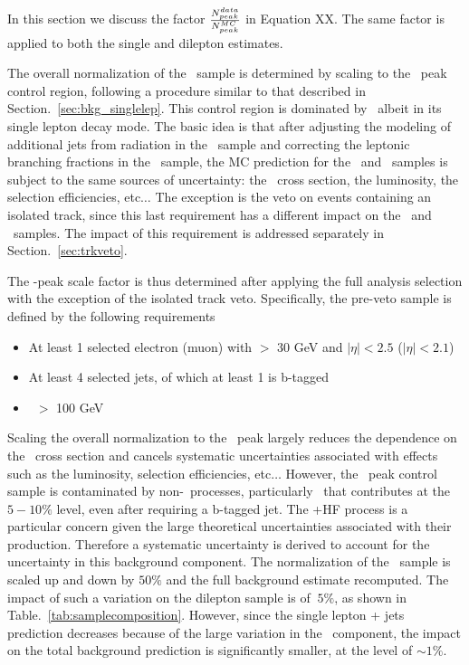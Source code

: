 In this section we discuss the factor $ {N_{peak}^{data} \over N_{peak}^{MC}} $ in Equation XX.
The same factor is applied to both the single and dilepton estimates.

The overall normalization of the \ttbar\ sample is determined by
scaling to the \mt\ peak control region, following a procedure similar 
to that described in Section.~\ref{sec:bkg_singlelep}. This control
region is dominated by \ttbar\, albeit in its single lepton decay
mode. The basic idea is that after adjusting the modeling of
additional jets from radiation in the \ttll\ sample and correcting  
the leptonic branching fractions in the \ttbar\ sample, the MC 
prediction for the \ttlj\ and \ttll\ samples is subject to the same
sources of uncertainty: the \ttbar\ cross section, the luminosity, the
selection efficiencies, etc$\dots$ The exception is the veto on events
containing an isolated track, since this last requirement has a different 
impact on the \ttlj\ and \ttll\ samples. The impact of this
requirement is addressed separately in Section.~\ref{sec:trkveto}. 

The \mt-peak scale factor is thus determined after applying the full
analysis selection with the exception of the isolated track veto. 
Specifically, the pre-veto sample is defined by the following requirements
\begin{itemize}
\item At least 1 selected electron (muon) with \pt $>$ 30 GeV and $|\eta|<2.5$ ($|\eta|<2.1$)
\item At least 4 selected jets, of which at least 1 is b-tagged
\item \met\ $>$ 100 GeV 
\end{itemize}

Scaling the overall 
normalization to the \mt\ peak largely reduces the dependence on the
\ttbar\ cross section and cancels systematic uncertainties associated
with effects such as the luminosity, selection efficiencies,
etc$\dots$ However, the \mt\ peak control sample is contaminated 
by non-\ttbar\ processes, particularly \wjets\ that contributes at
the $5-10\%$ level, even after requiring a b-tagged jet. The \wjets+HF
process is a particular concern given the large theoretical
uncertainties associated with their production. 
Therefore a systematic uncertainty is derived to account for
the uncertainty in this background component. The normalization of 
the \wjets\ sample is scaled up and down by $50\%$ and the full 
background estimate recomputed. The impact of such a variation on 
the dilepton sample is of $~5\%$, as shown in 
Table.~\ref{tab:samplecomposition}. However, since the
single lepton + jets prediction decreases because of the large
variation in the \wjets\ component, the impact on the total background
prediction is significantly smaller, at the level of $\sim 1\%$.


